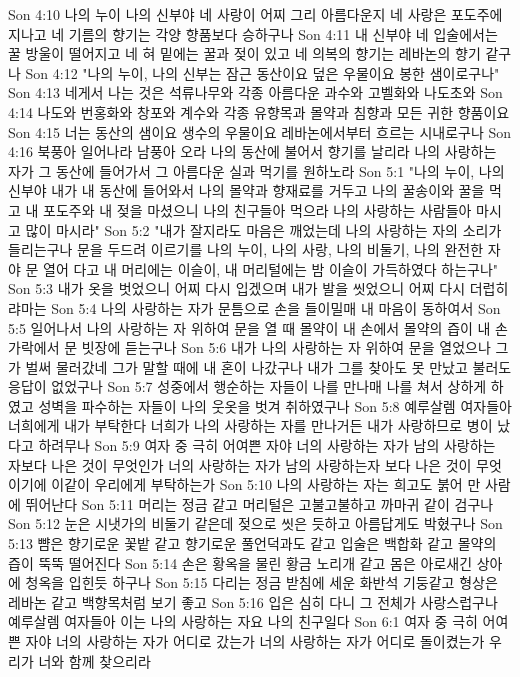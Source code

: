 Son 4:10  나의 누이 나의 신부야 네 사랑이 어찌 그리 아름다운지 네 사랑은 포도주에 지나고 네 기름의 향기는 각양 향품보다 승하구나
Son 4:11  내 신부야 네 입술에서는 꿀 방울이 떨어지고 네 혀 밑에는 꿀과 젖이 있고 네 의복의 향기는 레바논의 향기 같구나
Son 4:12  "나의 누이, 나의 신부는 잠근 동산이요 덮은 우물이요 봉한 샘이로구나"
Son 4:13  네게서 나는 것은 석류나무와 각종 아름다운 과수와 고벨화와 나도초와
Son 4:14  나도와 번홍화와 창포와 계수와 각종 유향목과 몰약과 침향과 모든 귀한 향품이요
Son 4:15  너는 동산의 샘이요 생수의 우물이요 레바논에서부터 흐르는 시내로구나
Son 4:16  북풍아 일어나라 남풍아 오라 나의 동산에 불어서 향기를 날리라 나의 사랑하는 자가 그 동산에 들어가서 그 아름다운 실과 먹기를 원하노라
Son 5:1  "나의 누이, 나의 신부야 내가 내 동산에 들어와서 나의 몰약과 향재료를 거두고 나의 꿀송이와 꿀을 먹고 내 포도주와 내 젖을 마셨으니 나의 친구들아 먹으라 나의 사랑하는 사람들아 마시고 많이 마시라"
Son 5:2  "내가 잘지라도 마음은 깨었는데 나의 사랑하는 자의 소리가 들리는구나 문을 두드려 이르기를 나의 누이, 나의 사랑, 나의 비둘기, 나의 완전한 자야 문 열어 다고 내 머리에는 이슬이, 내 머리털에는 밤 이슬이 가득하였다 하는구나"
Son 5:3  내가 옷을 벗었으니 어찌 다시 입겠으며 내가 발을 씻었으니 어찌 다시 더럽히랴마는
Son 5:4  나의 사랑하는 자가 문틈으로 손을 들이밀매 내 마음이 동하여서
Son 5:5  일어나서 나의 사랑하는 자 위하여 문을 열 때 몰약이 내 손에서 몰약의 즙이 내 손가락에서 문 빗장에 듣는구나
Son 5:6  내가 나의 사랑하는 자 위하여 문을 열었으나 그가 벌써 물러갔네 그가 말할 때에 내 혼이 나갔구나 내가 그를 찾아도 못 만났고 불러도 응답이 없었구나
Son 5:7  성중에서 행순하는 자들이 나를 만나매 나를 쳐서 상하게 하였고 성벽을 파수하는 자들이 나의 웃옷을 벗겨 취하였구나
Son 5:8  예루살렘 여자들아 너희에게 내가 부탁한다 너희가 나의 사랑하는 자를 만나거든 내가 사랑하므로 병이 났다고 하려무나
Son 5:9  여자 중 극히 어여쁜 자야 너의 사랑하는 자가 남의 사랑하는 자보다 나은 것이 무엇인가 너의 사랑하는 자가 남의 사랑하는자 보다 나은 것이 무엇이기에 이같이 우리에게 부탁하는가
Son 5:10  나의 사랑하는 자는 희고도 붉어 만 사람에 뛰어난다
Son 5:11  머리는 정금 같고 머리털은 고불고불하고 까마귀 같이 검구나
Son 5:12  눈은 시냇가의 비둘기 같은데 젖으로 씻은 듯하고 아름답게도 박혔구나
Son 5:13  뺨은 향기로운 꽃밭 같고 향기로운 풀언덕과도 같고 입술은 백합화 같고 몰약의 즙이 뚝뚝 떨어진다
Son 5:14  손은 황옥을 물린 황금 노리개 같고 몸은 아로새긴 상아에 청옥을 입힌듯 하구나
Son 5:15  다리는 정금 받침에 세운 화반석 기둥같고 형상은 레바논 같고 백향목처럼 보기 좋고
Son 5:16  입은 심히 다니 그 전체가 사랑스럽구나 예루살렘 여자들아 이는 나의 사랑하는 자요 나의 친구일다
Son 6:1  여자 중 극히 어여쁜 자야 너의 사랑하는 자가 어디로 갔는가 너의 사랑하는 자가 어디로 돌이켰는가 우리가 너와 함께 찾으리라

